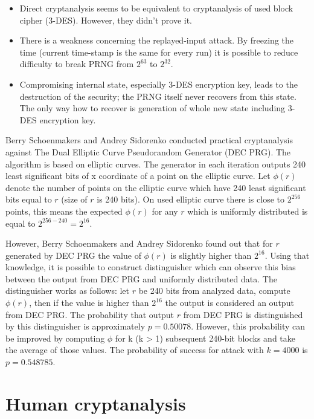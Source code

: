 \documentclass[
    digital,    %
    oneside,    %
    color,
    11pt,
    nocover,
    notable,
    nolof,
    nolot,
    final
]{fithesis3}
\renewcommand\_{\textunderscore\allowbreak}
\begin{document}
\begin{itemize}
	\item Direct cryptanalysis seems to be equivalent to cryptanalysis of used block cipher (3-DES). However, they didn't prove it.
	
	\item There is a weakness concerning the replayed-input attack. By freezing the time (current time-stamp is the same for every run) it is possible to reduce difficulty to break PRNG from $2^{63}$ to $2^{32}$.
	
	\item Compromising internal state, especially 3-DES encryption key, leads to the destruction of the security; the PRNG itself never recovers from this state. The only way how to recover is generation of whole new state including 3-DES encryption key.
\end{itemize}

Berry Schoenmakers and Andrey Sidorenko conducted practical cryptanalysis \cite{practical-cryptanalysis} against The Dual Elliptic Curve Pseudorandom Generator (DEC PRG)\cite{barker2007recommendation}. The algorithm is based on elliptic curves. The generator in each iteration outputs 240 least significant bits of x coordinate of a point on the elliptic curve. Let $\phi (r)$ denote the number of points on the elliptic curve which have 240 least significant bits equal to $ r $ (size of $ r $ is 240 bits). On used elliptic curve there is close to $2^{256}$ points, this means the expected $\phi (r)$ for any $ r $ which is uniformly distributed is equal to $2^{256 - 240} = 2^{16}$. 

However, Berry Schoenmakers and Andrey Sidorenko found out that for $ r $ generated by DEC PRG the value of $\phi (r)$ is slightly higher than $2^{16}$. Using that knowledge, it is possible to construct distinguisher which can observe this bias between the output from DEC PRG and uniformly distributed data. The distinguisher works as follows: let $ r $ be 240 bits from analyzed data, compute $\phi (r)$, then if the value is higher than $2^{16}$ the output is considered an output from DEC PRG. The probability that output $ r $ from DEC PRG is distinguished by this distinguisher is approximately $ p = 0.50078 $. However, this probability can be improved by computing $\phi$ for k (k > 1) subsequent 240-bit blocks and take the average of those values. The probability of success for attack with $ k = 4000 $ is $ p = 0.548785 $.

\section{Human cryptanalysis}
\end{document}
